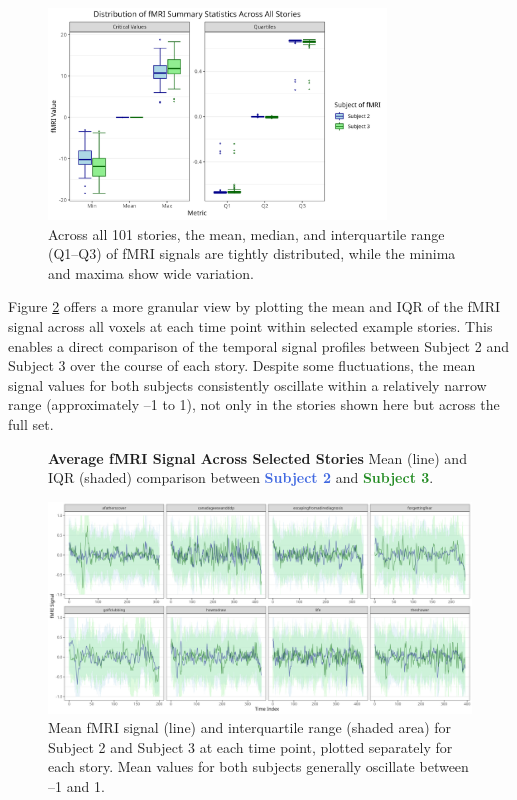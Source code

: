 \documentclass[10pt,letterpaper]{article}
\begin{document}
\begin{figure}[ht]
    \centering
    \includegraphics[width=0.8\textwidth]{figs/boxplots.png}
    \caption{Across all 101 stories, the mean, median, and interquartile range (Q1–Q3) of fMRI signals are tightly distributed, while the minima and maxima show wide variation.}
    \label{fig:boxplots}
\end{figure}

Figure \ref{fig:mean_signal} offers a more granular view by plotting the mean and IQR of the fMRI signal across all voxels at each time point within selected example stories. This enables a direct comparison of the temporal signal profiles between Subject 2 and Subject 3 over the course of each story. Despite some fluctuations, the mean signal values for both subjects consistently oscillate within a relatively narrow range (approximately –1 to 1), not only in the stories shown here but across the full set.

\begin{figure}[ht]
    \centering
    \parbox{\textwidth}{\centering 
        \fontsize{13pt}{13pt}\selectfont \textbf{Average fMRI Signal Across Selected Stories}  
        {\fontsize{11pt}{13pt}\selectfont Mean (line) and IQR (shaded) comparison between   \textcolor{RoyalBlue}{\textbf{Subject 2}} and \textcolor{ForestGreen}{\textbf{Subject 3}}.} 
    }
    \includegraphics[width=\textwidth]{figs/mean_signal.png}
    \caption{Mean fMRI signal (line) and interquartile range (shaded area) for Subject 2 and Subject 3 at each time point, plotted separately for each story. Mean values for both subjects generally oscillate between –1 and 1.}
    \label{fig:mean_signal}
\end{figure}
\end{document}
